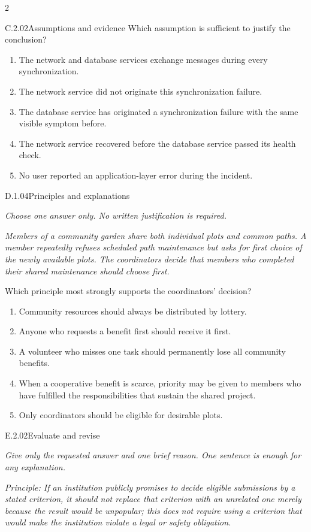 \documentclass[9pt]{extarticle}
\newcommand{\choice}[1]{\item #1}
\begin{document}
\begin{multicols}{2}
\begin{DenseCoreProblem}{C.2.02}{Assumptions and evidence}
Which assumption is sufficient to justify the conclusion?
\begin{enumerate}[label=(\alph*)]
  \choice{The network and database services exchange messages during every synchronization.}
  \choice{The network service did not originate this synchronization failure.}
  \choice{The database service has originated a synchronization failure with the same visible symptom before.}
  \choice{The network service recovered before the database service passed its health check.}
  \choice{No user reported an application-layer error during the incident.}
\end{enumerate}
\end{DenseCoreProblem}
\begin{DenseCoreProblem}{D.1.04}{Principles and explanations}
{\scriptsize\textit{Choose one answer only. No written justification is required.}\par}
\emph{Members of a community garden share both individual plots and common paths. A member repeatedly refuses scheduled path maintenance but asks for first choice of the newly available plots. The coordinators decide that members who completed their shared maintenance should choose first.}

Which principle most strongly supports the coordinators' decision?
\begin{enumerate}[label=(\alph*)]
  \choice{Community resources should always be distributed by lottery.}
  \choice{Anyone who requests a benefit first should receive it first.}
  \choice{A volunteer who misses one task should permanently lose all community benefits.}
  \choice{When a cooperative benefit is scarce, priority may be given to members who have fulfilled the responsibilities that sustain the shared project.}
  \choice{Only coordinators should be eligible for desirable plots.}
\end{enumerate}
\end{DenseCoreProblem}
\begin{DenseCoreProblem}{E.2.02}{Evaluate and revise}
{\scriptsize\textit{Give only the requested answer and one brief reason. One sentence is enough for any explanation.}\par}
\emph{Principle: If an institution publicly promises to decide eligible submissions by a stated criterion, it should not replace that criterion with an unrelated one merely because the result would be unpopular; this does not require using a criterion that would make the institution violate a legal or safety obligation.}


\end{DenseCoreProblem}
\end{multicols}
\end{document}
